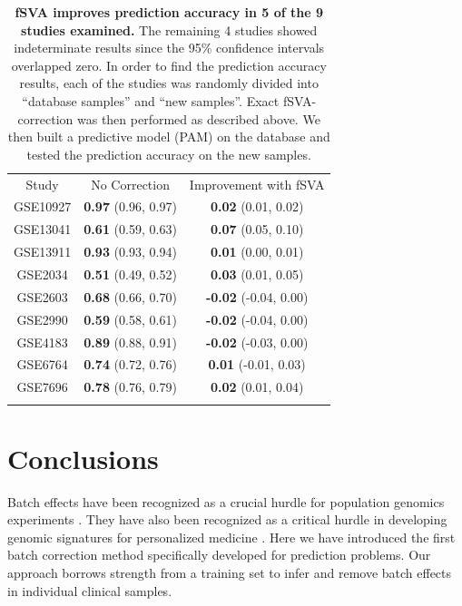 \documentclass{bioinfo}\usepackage{graphicx, color}
\begin{document}
\begin{table}
\begin{center}
\begin{tabular}{ccc}
   & \\
  \hline
Study & No Correction &  Improvement with fSVA \\
  \hline
GSE10927 & \textbf{0.97}
				  (0.96, 0.97) 
		 & \textbf{0.02}
				  (0.01, 0.02)  \\
GSE13041 & \textbf{0.61}
				  (0.59, 0.63) 
		 & \textbf{0.07}
				  (0.05, 0.10)  \\
GSE13911 & \textbf{0.93}
				  (0.93, 0.94) 
		 & \textbf{0.01}
				  (0.00, 0.01)  \\
GSE2034  & \textbf{0.51}
				  (0.49, 0.52) 
		 & \textbf{0.03}
				  (0.01, 0.05)  \\
GSE2603  & \textbf{0.68}
				  (0.66, 0.70) 
		 & \textbf{-0.02}
				  (-0.04, 0.00)  \\
GSE2990  & \textbf{0.59}
				  (0.58, 0.61) 
		 & \textbf{-0.02}
				  (-0.04, 0.00)  \\
GSE4183  & \textbf{0.89}
				  (0.88, 0.91) 
		 & \textbf{-0.02}
				  (-0.03, 0.00)  \\
GSE6764  & \textbf{0.74}
				  (0.72, 0.76) 
		 & \textbf{0.01}
				  (-0.01, 0.03)  \\
GSE7696  & \textbf{0.78}
				  (0.76, 0.79) 
		 & \textbf{0.02}
				  (0.01, 0.04)  \\
\hline
 & \\
\end{tabular}
\caption{\textbf{fSVA improves prediction accuracy in 5 of the 9 studies examined.} The remaining 4 studies showed indeterminate results since the 95\% confidence intervals overlapped zero.  In order to find the prediction accuracy results, each of the studies was randomly divided into ``database samples'' and ``new samples''.  Exact fSVA-correction was then performed as described above.  We then built a predictive model (PAM) on the database and tested the prediction accuracy on the new samples.}
\end{center}
\label{studytab}
\end{table}


\section{Conclusions}

Batch effects have been recognized as a crucial hurdle for population genomics experiments \citep{Leek2010,Parker2012}. They have also been recognized as a critical hurdle in developing genomic signatures for personalized medicine \citep{Micheel2012}. Here we have introduced the first batch correction method specifically developed for prediction problems. Our approach borrows strength from a training set to infer and remove batch effects in individual clinical samples. 
\end{document}
